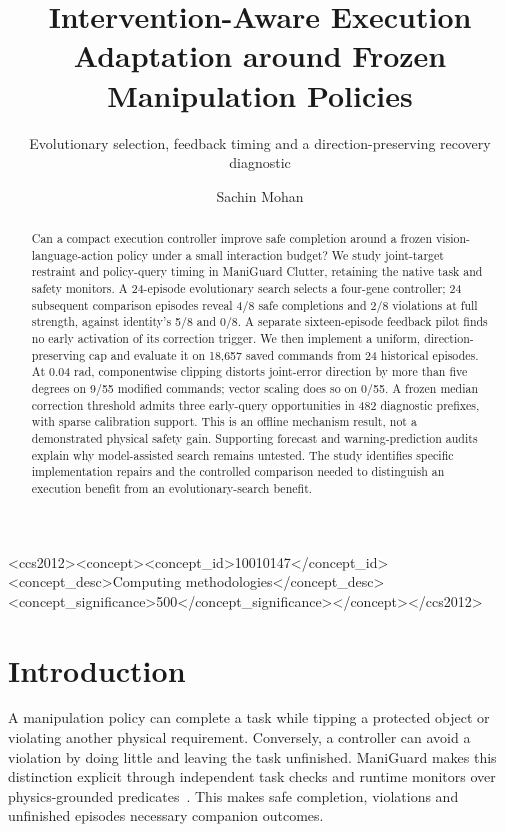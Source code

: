 \documentclass[sigconf,dvipsnames]{acmart}
\begin{document}
\title{Intervention-Aware Execution Adaptation around Frozen Manipulation Policies}
\subtitle{Evolutionary selection, feedback timing and a direction-preserving recovery diagnostic}
\author{Sachin Mohan}
\renewcommand{\shortauthors}{Mohan}
\begin{abstract}
Can a compact execution controller improve safe completion around a frozen
vision-language-action policy under a small interaction budget? We study joint-target
restraint and policy-query timing in ManiGuard Clutter, retaining the native task and
safety monitors. A 24-episode evolutionary search selects a four-gene controller;
24 subsequent comparison episodes reveal 4/8 safe completions and 2/8 violations at
full strength, against identity's 5/8 and 0/8. A separate sixteen-episode feedback
pilot finds no early activation of its correction trigger. We then implement a uniform,
direction-preserving cap and evaluate it on 18,657 saved commands from 24 historical
episodes. At 0.04 rad, componentwise clipping distorts joint-error direction by more
than five degrees on 9/55 modified commands; vector scaling does so on 0/55. A frozen
median correction threshold admits three early-query opportunities in 482 diagnostic
prefixes, with sparse calibration support. This is an offline mechanism result, not
a demonstrated physical safety gain. Supporting forecast and warning-prediction
audits explain why model-assisted search remains untested. The study identifies
specific implementation repairs and the controlled comparison needed to distinguish
an execution benefit from an evolutionary-search benefit.
\end{abstract}
\begin{CCSXML}
<ccs2012><concept><concept_id>10010147</concept_id>
<concept_desc>Computing methodologies</concept_desc>
<concept_significance>500</concept_significance></concept></ccs2012>
\end{CCSXML}
\maketitle

\section{Introduction}
A manipulation policy can complete a task while tipping a protected object or
violating another physical requirement. Conversely, a controller can avoid a
violation by doing little and leaving the task unfinished. ManiGuard makes this
distinction explicit through independent task checks and runtime monitors over
physics-grounded predicates~\cite{maniguard}. This makes safe completion, violations
and unfinished episodes necessary companion outcomes.
\end{document}
